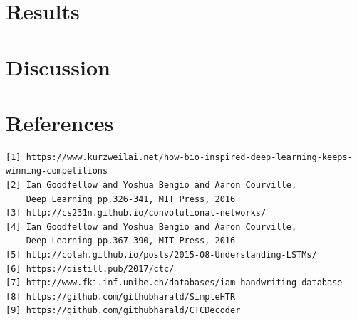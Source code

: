 \documentclass{article}
\begin{document}
\newpage
\section{Results}

\newpage
\section{Discussion}

\newpage
\section{References}
\begin{verbatim}
[1] https://www.kurzweilai.net/how-bio-inspired-deep-learning-keeps-winning-competitions
[2] Ian Goodfellow and Yoshua Bengio and Aaron Courville,
    Deep Learning pp.326-341, MIT Press, 2016
[3] http://cs231n.github.io/convolutional-networks/
[4] Ian Goodfellow and Yoshua Bengio and Aaron Courville,
    Deep Learning pp.367-390, MIT Press, 2016
[5] http://colah.github.io/posts/2015-08-Understanding-LSTMs/
[6] https://distill.pub/2017/ctc/
[7] http://www.fki.inf.unibe.ch/databases/iam-handwriting-database
[8] https://github.com/githubharald/SimpleHTR
[9] https://github.com/githubharald/CTCDecoder
\end{verbatim}
\end{document}
